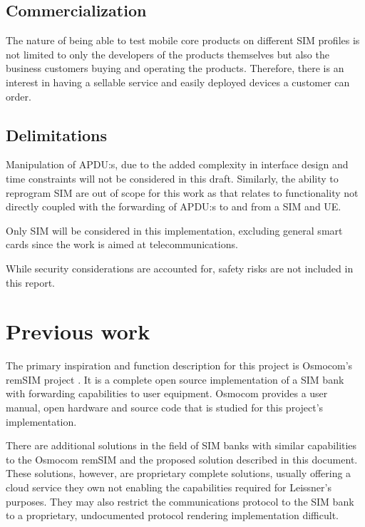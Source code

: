 \subsection{Commercialization}

The nature of being able to test mobile core products on different
SIM profiles is not limited to only the developers of the products
themselves but also the business customers buying and operating the
products. Therefore, there is an interest in having a sellable
service and easily deployed devices a customer can order.

\subsection{Delimitations}

Manipulation of APDU:s, due to the added complexity in interface
design and time constraints will not be considered in this draft.
Similarly, the ability to reprogram SIM are out of scope for this
work as that relates to functionality not directly coupled with the
forwarding of APDU:s to and from a SIM and UE.

Only SIM will be considered in this implementation, excluding
general smart cards since the work is aimed at telecommunications.

While security considerations are accounted for, safety risks are
not included in this report.

\section{Previous work}

The primary inspiration and function description for this project
is Osmocom's remSIM project \cite{osmocom-remsim}. It is a complete
open source implementation of a SIM bank with forwarding
capabilities to user equipment. Osmocom provides a user manual,
open hardware and source code that is studied for this project's
implementation.

There are additional solutions in the field of SIM banks with
similar capabilities to the Osmocom remSIM and the proposed
solution described in this document. These solutions, however, are
proprietary \cite{polygator-sim-bank} complete solutions, usually
offering a cloud service they own
\cite{placeholder-source-cloud-sim-bank} not enabling the
capabilities required for Leissner's purposes. They may also
restrict the communications protocol to the SIM bank to a
proprietary, undocumented protocol rendering implementation
difficult.

